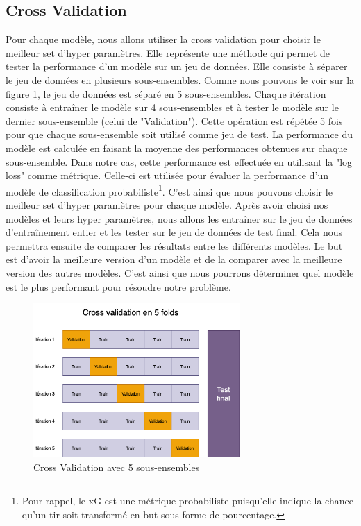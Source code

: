 \documentclass[12pt]{article}
\begin{document}
\subsection{Cross Validation}
\label{sec:cross_validation}
Pour chaque modèle, nous allons utiliser la cross validation pour choisir le meilleur set d'hyper paramètres.
Elle représente une méthode qui permet de tester la performance d'un modèle sur un jeu de données.
Elle consiste à séparer le jeu de données en plusieurs sous-ensembles.
Comme nous pouvons le voir sur la figure \ref{fig:cross_validation}, le jeu de données est séparé en 5 sous-ensembles.
Chaque itération consiste à entraîner le modèle sur 4 sous-ensembles et à tester le modèle sur le dernier sous-ensemble (celui de "Validation").
Cette opération est répétée 5 fois pour que chaque sous-ensemble soit utilisé comme jeu de test.
La performance du modèle est calculée en faisant la moyenne des performances obtenues sur chaque sous-ensemble.
Dans notre cas, cette performance est effectuée en utilisant la "log loss" comme métrique.
Celle-ci est utilisée pour évaluer la performance d'un modèle de classification probabiliste\footnote{Pour rappel, le xG est une métrique probabiliste puisqu'elle indique la chance qu'un tir soit transformé en but sous forme de pourcentage.}.
C'est ainsi que nous pouvons choisir le meilleur set d'hyper paramètres pour chaque modèle.
\newline\newline
Après avoir choisi nos modèles et leurs hyper paramètres, nous allons les entraîner sur le jeu de données d'entraînement entier et les tester sur le jeu de données de test final.
Cela nous permettra ensuite de comparer les résultats entre les différents modèles.
Le but est d'avoir la meilleure version d'un modèle et de la comparer avec la meilleure version des autres modèles. 
C'est ainsi que nous pourrons déterminer quel modèle est le plus performant pour résoudre notre problème.
\begin{figure}[htp]
    \centering
    \includegraphics[width=0.7\textwidth]{img/cross_validation_schema.png}
    \caption{Cross Validation avec 5 sous-ensembles}
    \label{fig:cross_validation}
\end{figure}
\end{document}
